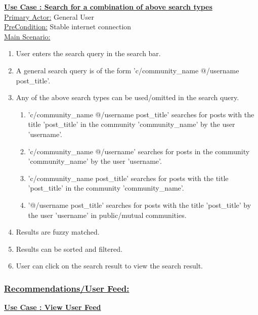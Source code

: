 \documentclass[conference,compsoc]{IEEEtran}
\newcounter{UC}
\newcommand{\nextU}{\stepcounter{UC}\theUC}
\begin{document}
\underline{\textbf{Use Case \nextU: Search for a combination of above search types}}\\

\underline{Primary Actor:} General User\\

\underline{PreCondition:} Stable internet connection\\

\underline{Main Scenario:}\\
\begin{enumerate}
    \item User enters the search query in the search bar.
    \item A general search query is of the form 'c/community\_name @/username post\_title'.
    \item Any of the above search types can be used/omitted in the search query.
          \begin{enumerate}
              \item 'c/community\_name @/username post\_title' searches for posts with the title 'post\_title' in the community 'community\_name' by the user 'username'.
              \item 'c/community\_name @/username' searches for posts in the community 'community\_name' by the user 'username'.
              \item 'c/community\_name post\_title' searches for posts with the title 'post\_title' in the community 'community\_name'.
              \item '@/username post\_title' searches for posts with the title 'post\_title' by the user 'username' in public/mutual communities.
          \end{enumerate}
    \item Results are fuzzy matched.
    \item Results can be sorted and filtered.
    \item User can click on the search result to view the search result.
\end{enumerate}

\subsubsection{\underline{Recommendations/User Feed:}}
\vspace{0.2cm}

\underline{\textbf{Use Case \nextU: View User Feed}}\\
\end{document}
